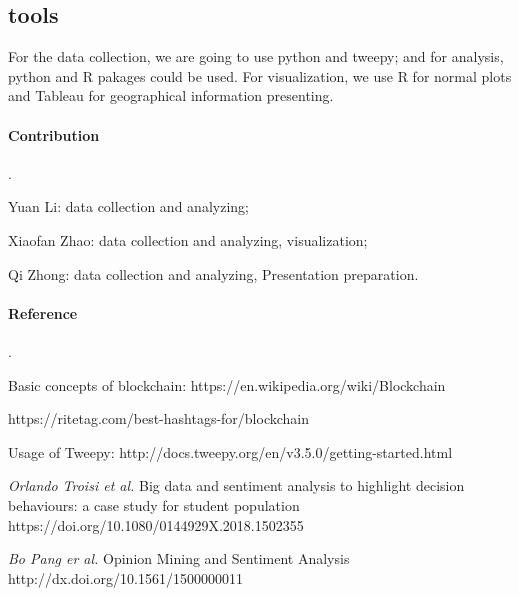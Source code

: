 \documentclass{article}
\begin{document}
\subsection{tools}

For the data collection, we are going to use python and tweepy; and for analysis, python and R pakages could be used. For visualization, we use R for normal plots and Tableau for geographical information presenting.

\paragraph{Contribution}.

Yuan Li: data collection and analyzing;

Xiaofan Zhao: data collection and analyzing, visualization;

Qi Zhong: data collection and analyzing, Presentation preparation.



\paragraph{Reference}.

Basic concepts of blockchain: https://en.wikipedia.org/wiki/Blockchain

https://ritetag.com/best-hashtags-for/blockchain

Usage of Tweepy: http://docs.tweepy.org/en/v3.5.0/getting-started.html

\textit{Orlando Troisi et al.} Big data and sentiment analysis to highlight decision behaviours: a case study for student population https://doi.org/10.1080/0144929X.2018.1502355

\textit{Bo Pang er al.} Opinion Mining and Sentiment Analysis http://dx.doi.org/10.1561/1500000011
\end{document}
